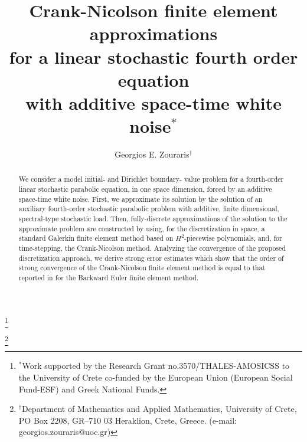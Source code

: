 \documentclass[10pt]{amsart}
\numberwithin{equation}{section}
\begin{document}
\title[]
{Crank-Nicolson finite element approximations\\
for a linear stochastic fourth order equation \\
with additive space-time white noise$^{*}$}
\thanks{$^{*}$Work supported by the Research Grant no.3570/THALES-AMOSICSS to the University
of Crete co-funded by the European Union (European Social Fund-ESF) and Greek National
Funds.}
\author[]
{Georgios E. Zouraris$^{\dag}$}
\thanks{$^{\dag}$Department of Mathematics and Applied Mathematics,
University of Crete, PO Box 2208,
GR--710 03 Heraklion, Crete, Greece.
(e-mail: georgios.zouraris@uoc.gr)}

\maketitle
\begin{abstract}
We consider a model initial- and Dirichlet boundary- value problem for
a fourth-order linear stochastic parabolic equation, in one space
dimension, forced by an additive space-time white noise. 
First, we approximate its solution by the solution of an auxiliary
fourth-order stochastic parabolic problem with additive, finite dimensional,
spectral-type stochastic load. 
Then, fully-discrete approximations of the solution to the approximate
problem are constructed by using, for the discretization in space, a
standard Galerkin finite element method based on $H^2$-piecewise
polynomials, and, for time-stepping, the Crank-Nicolson method.
Analyzing the convergence of the proposed discretization approach,
we derive strong error estimates which show that the order of strong
convergence of the Crank-Nicolson finite element method is equal to
that reported in \cite{KZ2010} for the Backward Euler finite element method.
\end{abstract}
\end{document}
